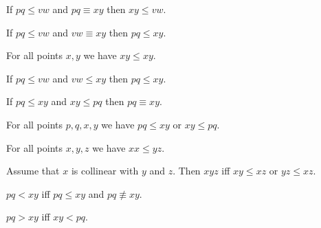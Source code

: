 \documentclass[10pt,a4paper,parskip=half,numbers=endperiod,headings=standardclasses,parskip]{scrbook}
\newcommand{\Cong}[4]{#1 #2 \equiv #3 #4}
\newcommand{\NotCong}[4]{#1 #2 \not\equiv #3 #4}
\newcommand{\Betw}[3]{#1 #2 #3}
\newcommand{\Leq}[4]{#1 #2 \leq #3 #4}
\newcommand{\Less}[4]{#1 #2 < #3 #4}
\newcommand{\Greater}[4]{#1 #2 > #3 #4}
\begin{document}
  \begin{forthel}
    \begin{lemma}[LessCongLeft] %
      If $\Leq{p}{q}{v}{w}$ and $\Cong{p}{q}{x}{y}$
      then $\Leq{x}{y}{v}{w}$.
    \end{lemma}

    \begin{lemma}[LessCongRight] %
      If $\Leq{p}{q}{v}{w}$ and $\Cong{v}{w}{x}{y}$
      then $\Leq{p}{q}{x}{y}$.
    \end{lemma}

    \begin{lemma}[LessReflexivity] %
      For all points $x, y$ we have $\Leq{x}{y}{x}{y}$.
    \end{lemma}

    \begin{lemma}[LessTransitivity] %
      If $\Leq{p}{q}{v}{w}$ and $\Leq{v}{w}{x}{y}$ then $\Leq{p}{q}{x}{y}$.
    \end{lemma}

    \begin{axiom}[LessClamp] %
      If $\Leq{p}{q}{x}{y}$ and $\Leq{x}{y}{p}{q}$ then $\Cong{p}{q}{x}{y}$.
    \end{axiom}

    \begin{axiom}[LessConnex] %
      For all points $p, q, x, y$ we have $\Leq{p}{q}{x}{y}$ or $\Leq{x}{y}{p}{q}$.
    \end{axiom}

    \begin{lemma} %
      For all points $x, y, z$ we have $\Leq{x}{x}{y}{z}$.
    \end{lemma}

    \begin{axiom} %
      Assume that $x$ is collinear with $y$ and $z$.
      Then $\Betw{x}{y}{z}$ iff $\Leq{x}{y}{x}{z}$ or $\Leq{y}{z}{x}{z}$.
    \end{axiom}
  \end{forthel}


  \begin{forthel}
    \begin{definition}
      $\Less{p}{q}{x}{y}$ iff $\Leq{p}{q}{x}{y}$ and $\NotCong{p}{q}{x}{y}$.
    \end{definition}

    \begin{definition}
      $\Greater{p}{q}{x}{y}$ iff $\Less{x}{y}{p}{q}$.
    \end{definition}
  \end{forthel}
\end{document}
